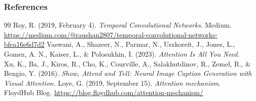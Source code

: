 \documentclass[11pt,compress,t,notes=noshow, xcolor=table]{beamer}
\begin{document}
\begin{vbframe}
\frametitle{References}
\footnotesize{
\begin{thebibliography}{99}
 Roy, R. (2019, February 4). \textit{Temporal Convolutional Networks}. Medium. \url{https://medium.com/@raushan2807/temporal-convolutional-networks-bfea16e6d7d2}
 Vaswani, A., Shazeer, N., Parmar, N., Uszkoreit, J., Jones, L., Gomez, A. N., Kaiser, L., \& Polosukhin, I. (2023). \textit{Attention Is All You Need.}
 Xu, K., Ba, J., Kiros, R., Cho, K., Courville, A., Salakhutdinov, R., Zemel, R., \& Bengio, Y. (2016). \textit{Show, Attend and Tell: Neural Image Caption Generation with Visual Attention.}
 Loye, G. (2019, September 15). \textit{Attention mechanism}. FloydHub Blog. \url{https://blog.floydhub.com/attention-mechanism/}



\end{thebibliography}}
\end{vbframe}
\end{document}
